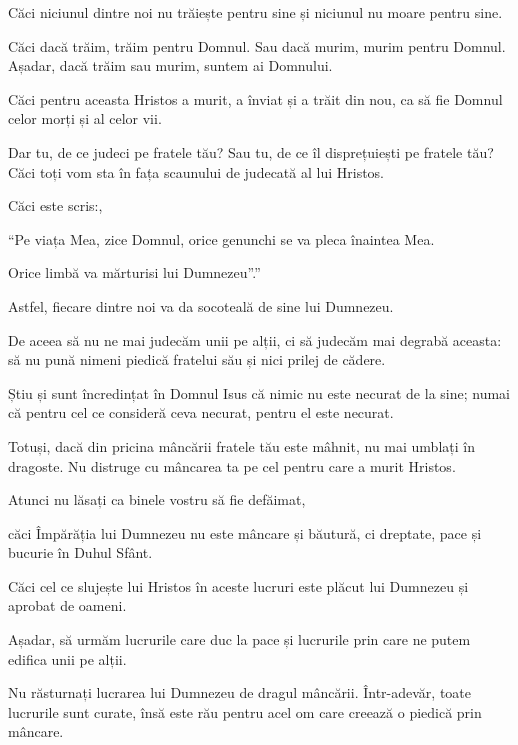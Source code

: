 {Căci niciunul dintre noi nu trăiește pentru sine și niciunul nu moare pentru sine.

Căci dacă trăim, trăim pentru Domnul. Sau dacă murim, murim pentru Domnul. Așadar, dacă trăim sau murim, suntem ai Domnului.

Căci pentru aceasta Hristos a murit, a înviat și a trăit din nou, ca să fie Domnul celor morți și al celor vii.


\par }{\PP {}Dar tu, de ce judeci pe fratele tău? Sau tu, de ce îl disprețuiești pe fratele tău? Căci toți vom sta în fața scaunului de judecată al lui Hristos.

Căci este scris:,

\par }{\Q “Pe viața Mea, zice Domnul, orice genunchi se va pleca înaintea Mea.

\par }{\QB Orice limbă va mărturisi lui Dumnezeu”.”


\par }{\PP {}Astfel, fiecare dintre noi va da socoteală de sine lui Dumnezeu.


\par }{\PP {}De aceea să nu ne mai judecăm unii pe alții, ci să judecăm mai degrabă aceasta: să nu pună nimeni piedică fratelui său și nici prilej de cădere.

Știu și sunt încredințat în Domnul Isus că nimic nu este necurat de la sine; numai că pentru cel ce consideră ceva necurat, pentru el este necurat.

Totuși, dacă din pricina mâncării fratele tău este mâhnit, nu mai umblați în dragoste. Nu distruge cu mâncarea ta pe cel pentru care a murit Hristos.

Atunci nu lăsați ca binele vostru să fie defăimat,

căci Împărăția lui Dumnezeu nu este mâncare și băutură, ci dreptate, pace și bucurie în Duhul Sfânt.

Căci cel ce slujește lui Hristos în aceste lucruri este plăcut lui Dumnezeu și aprobat de oameni.

Așadar, să urmăm lucrurile care duc la pace și lucrurile prin care ne putem edifica unii pe alții.

Nu răsturnați lucrarea lui Dumnezeu de dragul mâncării. Într-adevăr, toate lucrurile sunt curate, însă este rău pentru acel om care creează o piedică prin mâncare.

}
